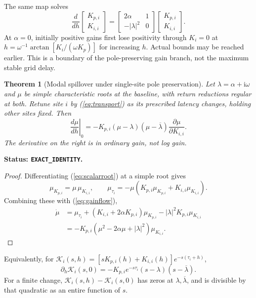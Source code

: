 \documentclass[11pt]{article}
\newtheorem{theorem}{Theorem}
\newcommand{\ii}{\mathrm{i}}
\newcommand{\status}[1]{\par\smallskip\noindent\textbf{Status: \texttt{#1}.}\ }
\begin{document}
The same map solves
\begin{equation}
 \frac{d}{dh}\begin{bmatrix}K_{p,i}\\K_{i,i}\end{bmatrix}
 =\begin{bmatrix}2\alpha&1\\-|\lambda|^2&0\end{bmatrix}
             \begin{bmatrix}K_{p,i}\\K_{i,i}\end{bmatrix}. \label{eq:gainflow}
\end{equation}
At $\alpha=0$, initially positive gains first lose positivity through
$K_i=0$ at $h=\omega^{-1}\arctan[K_i/(\omega K_p)]$ for increasing $h$.
Actual bounds may be reached earlier. This is a boundary of the
pole-preserving gain branch, not the maximum stable grid delay.

\begin{theorem}[Modal spillover under single-site pole preservation]
Let $\lambda=\alpha+\ii\omega$ and $\mu$ be simple characteristic
roots at the baseline, with return reductions regular at both.
Retune site $i$ by (\ref{eq:transport}) as its prescribed latency
changes, holding other sites fixed. Then
\begin{equation}
 \boxed{\left.\frac{d\mu}{dh}\right|_{0}
 =-K_{p,i}(\mu-\lambda)(\mu-\overline\lambda)
                         \frac{\partial\mu}{\partial K_{i,i}} .}
 \label{eq:spillover}
\end{equation}
The derivative on the right is in ordinary gain, not log gain.
\end{theorem}
\status{EXACT\_IDENTITY}
\begin{proof}
Differentiating (\ref{eq:scalarroot}) at a simple root gives
\[
 \mu_{K_{p,i}}=\mu\,\mu_{K_{i,i}},\qquad
 \mu_{\tau_i}=-\mu(K_{p,i}\mu_{K_{p,i}}+K_{i,i}\mu_{K_{i,i}}).
\]
Combining these with (\ref{eq:gainflow}),
\begin{align*}
 \dot\mu&=\mu_{\tau_i}
 +(K_{i,i}+2\alpha K_{p,i})\mu_{K_{p,i}}
 -|\lambda|^2K_{p,i}\mu_{K_{i,i}}\\
 &=-K_{p,i}(\mu^2-2\alpha\mu+|\lambda|^2)\mu_{K_{i,i}} .
\end{align*}
\end{proof}
Equivalently, for
$\mathcal K_i(s,h)=[sK_{p,i}(h)+K_{i,i}(h)]e^{-s(\tau_i+h)}$,
\[
 \partial_h\mathcal K_i(s,0)=
 -K_{p,i}e^{-s\tau_i}(s-\lambda)(s-\overline\lambda).
\]
For a finite change, $\mathcal K_i(s,h)-\mathcal K_i(s,0)$ has
zeros at $\lambda,\overline\lambda$, and is divisible by that
quadratic as an entire function of $s$.
\end{document}
